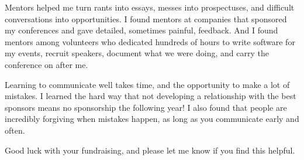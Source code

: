 Mentors helped me turn rants into essays, messes into prospectuses, and
difficult conversations into opportunities. I found mentors at companies that
sponsored my conferences and gave detailed, sometimes painful, feedback. And I
found mentors among volunteers who dedicated hundreds of hours to write software
for my events, recruit speakers, document what we were doing, and carry the
conference on after me. 

Learning to communicate well takes time, and the opportunity to make a lot of
mistakes. I learned the hard way that not developing a relationship with the
best sponsors means no sponsorship the following year! I also found that people
are incredibly forgiving when mistakes happen, as long as you communicate early
and often.

Good luck with your fundraising, and please let me know if you find this
helpful.
